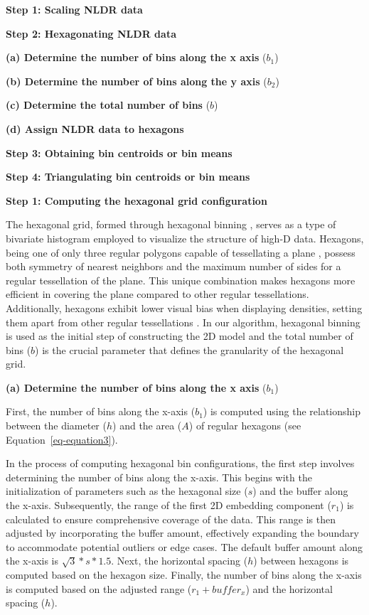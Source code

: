 \documentclass[
  12pt]{article}
\begin{document}
\textbf{Step 1: Scaling NLDR data}

\textbf{Step 2: Hexagonating NLDR data}

\textbf{(a) Determine the number of bins along the x axis} (\(b_1\))

\textbf{(b) Determine the number of bins along the y axis} (\(b_2\))

\textbf{(c) Determine the total number of bins} (\(b\))

\textbf{(d) Assign NLDR data to hexagons}

\textbf{Step 3: Obtaining bin centroids or bin means}

\textbf{Step 4: Triangulating bin centroids or bin means}

\textbf{Step 1: Computing the hexagonal grid configuration}

The hexagonal grid, formed through hexagonal binning
\citep[\citet{article66}]{Carr1987}, serves as a type of bivariate
histogram employed to visualize the structure of high-D data. Hexagons,
being one of only three regular polygons capable of tessellating a plane
\citep{Carr2013}, possess both symmetry of nearest neighbors and the
maximum number of sides for a regular tessellation of the plane. This
unique combination makes hexagons more efficient in covering the plane
compared to other regular tessellations. Additionally, hexagons exhibit
lower visual bias when displaying densities, setting them apart from
other regular tessellations \citep{Dan2023}. In our algorithm, hexagonal
binning is used as the initial step of constructing the 2D model and the
total number of bins (\(b\)) is the crucial parameter that defines the
granularity of the hexagonal grid.

\textbf{(a) Determine the number of bins along the x axis} (\(b_1\))

First, the number of bins along the x-axis (\(b_1\)) is computed using
the relationship between the diameter (\(h\)) and the area (\(A\)) of
regular hexagons (see Equation~\ref{eq-equation3}).

In the process of computing hexagonal bin configurations, the first step
involves determining the number of bins along the x-axis. This begins
with the initialization of parameters such as the hexagonal size (\(s\))
and the buffer along the x-axis. Subsequently, the range of the first 2D
embedding component (\(r_1\)) is calculated to ensure comprehensive
coverage of the data. This range is then adjusted by incorporating the
buffer amount, effectively expanding the boundary to accommodate
potential outliers or edge cases. The default buffer amount along the
x-axis is \(\sqrt{3} * s * 1.5\). Next, the horizontal spacing (\(h\))
between hexagons is computed based on the hexagon size. Finally, the
number of bins along the x-axis is computed based on the adjusted range
(\(r_1 + buffer_{x}\)) and the horizontal spacing (\(h\)).
\end{document}
